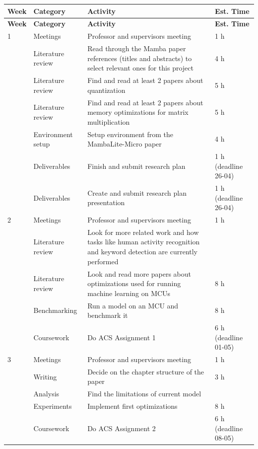 \documentclass[english, a4paper]{article}
\begin{document}
\setlength{\LTleft}{0pt}
\setlength{\LTright}{0pt}
\begin{longtable}{p{1.0cm} p{3.1cm} p{7.0cm} p{3.0cm}}
\hline
\textbf{Week} & \textbf{Category} & \textbf{Activity} & \textbf{Est. Time} \\
\hline
\endfirsthead
\hline
\textbf{Week} & \textbf{Category} & \textbf{Activity} & \textbf{Est. Time} \\
\hline
\endhead
\hline
\endfoot

1 & Meetings & Professor and supervisors meeting & 1 h \\
    & Literature review & Read through the Mamba paper references (titles and abstracts) to select relevant ones for this project & 4 h \\
    & Literature review & Find and read at least 2 papers about quantization & 5 h \\
    & Literature review & Find and read at least 2 papers about memory optimizations for matrix multiplication & 5 h \\
    & Environment setup & Setup environment from the MambaLite-Micro paper & 4 h \\
    & Deliverables & Finish and submit research plan & 1 h (deadline 26-04) \\
    & Deliverables & Create and submit research plan presentation & 1 h (deadline 26-04) \\
\hline

2 & Meetings & Professor and supervisors meeting & 1 h \\
    & Literature review & Look for more related work and how tasks like human activity recognition and keyword detection are currently performed &  \\
    & Literature review & Look and read more papers about optimizations used for running machine learning on MCUs & 8 h \\
    & Benchmarking & Run a model on an MCU and benchmark it & 8 h \\
    & Coursework & Do ACS Assignment 1 & 6 h (deadline 01-05) \\
\hline

3 & Meetings & Professor and supervisors meeting & 1 h \\
    & Writing & Decide on the chapter structure of the paper & 3 h \\
    & Analysis & Find the limitations of current model & \\
    & Experiments & Implement first optimizations & 8 h \\
    & Coursework & Do ACS Assignment 2 & 6 h (deadline 08-05) \\
\hline


\end{longtable}
\end{document}
